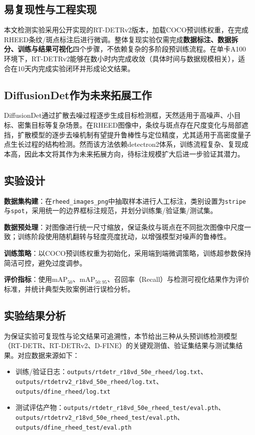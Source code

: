 \subsection{易复现性与工程实现}

本文检测实验采用公开实现的RT-DETRv2版本，加载COCO预训练权重，在完成RHEED条纹/斑点标注后进行微调。整体复现实验仅需完成\textbf{数据标注、数据拆分、训练与结果可视化}四个步骤，不依赖复杂的多阶段预训练流程。在单卡A100环境下，RT-DETRv2能够在数小时内完成收敛（具体时间与数据规模相关），适合在10天内完成实验闭环并形成论文结果。

\subsection{DiffusionDet作为未来拓展工作}

DiffusionDet通过扩散去噪过程逐步生成目标检测框，天然适用于高噪声、小目标、密集目标等复杂场景。在RHEED图像中，条纹与斑点存在尺度变化与局部遮挡，扩散模型的逐步去噪机制有望提升鲁棒性与定位精度，尤其适用于高密度量子点生长过程的结构检测。然而该方法依赖detectron2体系，训练流程复杂、复现成本高，因此本文将其作为未来拓展方向，待标注规模扩大后进一步验证其潜力。

\subsection{实验设计}

\textbf{数据集构建}：在\texttt{rheed\_images\_png}中抽取样本进行人工标注，类别设置为\texttt{stripe}与\texttt{spot}，采用统一的边界框标注规范，并划分训练集/验证集/测试集。

\textbf{数据预处理}：对图像进行统一尺寸缩放，保证条纹与斑点在不同批次图像中尺度一致；训练阶段使用随机翻转与轻度亮度扰动，以增强模型对噪声的鲁棒性。

\textbf{训练策略}：以COCO预训练权重为初始化，采用端到端微调策略，训练超参数保持简洁可控，避免过度调参。

\textbf{评价指标}：使用mAP$_{50}$、mAP$_{50:95}$、召回率（Recall）与检测可视化结果作为评价标准，并统计典型失败案例进行误检分析。

\subsection{实验结果分析}

为保证实验可复现性与论文结果可追溯性，本节给出三种从头预训练检测模型（RT-DETR、RT-DETRv2、D-FINE）的关键观测值、验证集结果与测试集结果。对应数据来源如下：
\begin{itemize}
    \item 训练/验证日志：\texttt{outputs/rtdetr\_r18vd\_50e\_rheed/log.txt}、\texttt{outputs/rtdetrv2\_r18vd\_50e\_rheed/log.txt}、\texttt{outputs/dfine\_rheed/log.txt}
    \item 测试评估产物：\texttt{outputs/rtdetr\_r18vd\_50e\_rheed\_test/eval.pth}、\texttt{outputs/rtdetrv2\_r18vd\_50e\_rheed\_test/eval.pth}、\texttt{outputs/dfine\_rheed\_test/eval.pth}
\end{itemize}

